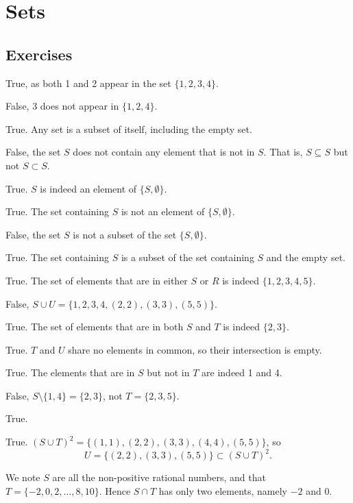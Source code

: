 \section{Sets}
\subsection*{Exercises}
\begin{questions}
    \item \begin{partquestions}{\alph*}
        \item True, as both 1 and 2 appear in the set $\{1, 2, 3, 4\}$.
        \item False, 3 does not appear in $\{1, 2, 4\}$.
        \item True. Any set is a subset of itself, including the empty set.
        \item False, the set $S$ does not contain any element that is not in $S$. That is, $S \subseteq S$ but not $S \subset S$.
        \item True. $S$ is indeed an element of $\{S, \emptyset\}$.
        \item True. The set containing $S$ is not an element of $\{S, \emptyset\}$.
        \item False, the set $S$ is not a subset of the set $\{S, \emptyset\}$.
        \item True. The set containing $S$ is a subset of the set containing $S$ and the empty set.
    \end{partquestions}

    \item \begin{partquestions}{\alph*}
        \item True. The set of elements that are in either $S$ or $R$ is indeed $\{1, 2, 3, 4, 5\}$.
        \item False, $S \cup U = \{1, 2, 3, 4, (2, 2), (3, 3), (5, 5)\}$.
        \item True. The set of elements that are in both $S$ and $T$ is indeed $\{2, 3\}$.
        \item True. $T$ and $U$ share no elements in common, so their intersection is empty.
        \item True. The elements that are in $S$ but not in $T$ are indeed 1 and 4.
        \item False, $S \setminus \{1, 4\} = \{2, 3\}$, not $T = \{2, 3, 5\}$.
        \item True.
        \item True. $(S \cup T)^2 = \{(1,1), (2,2), (3,3), (4,4), (5,5)\}$, so
        \[
            U = \{(2,2), (3,3), (5,5)\} \subset (S \cup T)^2.
        \]
    \end{partquestions}

    \item We note $S$ are all the non-positive rational numbers, and that $T = \{-2, 0, 2, \dots, 8, 10\}$. Hence $S \cap T$ has only two elements, namely $-2$ and $0$.
\end{questions}

